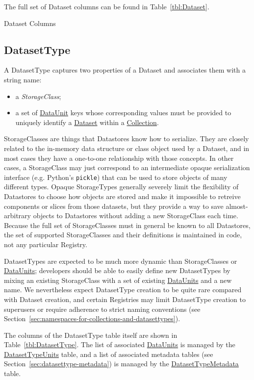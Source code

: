 \documentclass[DM,toc]{lsstdoc}
\newcommand{\tblref}[1]{\hyperref[tbl:#1]{#1}}
\newcommand{\coltable}[1]{
    \begin{table}[htb]
        {
            \footnotesize
            
        }
        \caption{#1 Columns}
        \label{tbl:#1}
    \end{table}
}
\begin{document}
The full set of Dataset columns can be found in Table~\ref{tbl:Dataset}.

\coltable{Dataset}


\subsection{DatasetType}
\label{sec:DatasetType}

A DatasetType captures two properties of a Dataset and associates them with a string name:
\begin{itemize}
    \item a \emph{StorageClass};
    \item a set of \hyperref[sec:dataunits]{DataUnit} keys whose corresponding values must be provided to uniquely identify a \tblref{Dataset} within a \hyperref[sec:collections]{Collection}.
\end{itemize}

StorageClasses are things that Datastores know how to serialize.
They are closely related to the in-memory data structure or class object used by a Dataset, and in most cases they have a one-to-one relationship with those concepts.
In other cases, a StorageClass may just correspond to an intermediate opaque serialization interface (e.g. Python's \texttt{pickle}) that can be used to store objects of many different types.
Opaque StorageTypes generally severely limit the flexibility of Datastores to choose how objects are stored and make it impossible to retreive components or slices from those datasets, but they provide a way to save almost-arbitrary objects to Datastores without adding a new StorageClass each time.
Because the full set of StorageClasses must in general be known to all Datastores, the set of supported StorageClasses and their definitions is maintained in code, not any particular Registry.

DatasetTypes are expected to be much more dynamic than StorageClasses or \hyperref[sec:dataunits]{DataUnits}; developers should be able to easily define new DatasetTypes by mixing an existing StorageClass with a set of existing \hyperref[sec:dataunits]{DataUnits} and a new name.
We nevertheless expect DatasetType creation to be quite rare compared with Dataset creation, and certain Registries may limit DatasetType creation to superusers or require adherence to strict naming conventions (see Section~\ref{sec:namespaces-for-collections-and-datasettypes}).

The columns of the DatasetType table itself are shown in Table~\ref{tbl:DatasetType}.
The list of associated \hyperref[sec:dataunits]{DataUnits} is managed by the \tblref{DatasetTypeUnits} table, and a list of associated metadata tables (see Section~\ref{sec:datasettype-metadata}) is managed by the \tblref{DatasetTypeMetadata} table.
\end{document}
